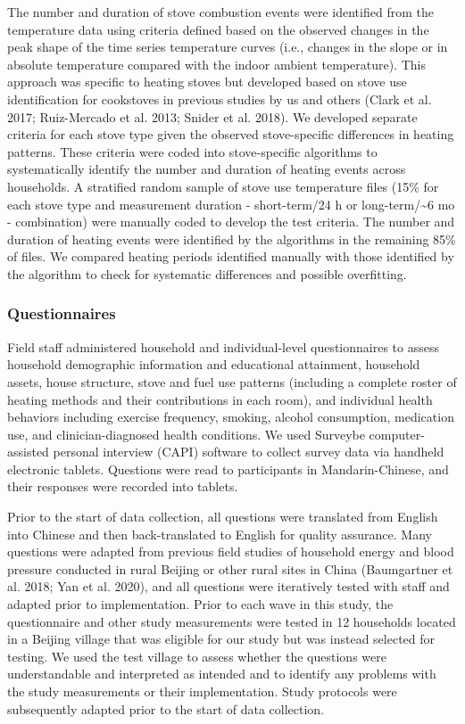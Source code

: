\documentclass[
  letterpaper,
  DIV=11,
  numbers=noendperiod]{scrartcl}
\begin{document}
The number and duration of stove combustion events were identified from
the temperature data using criteria defined based on the observed
changes in the peak shape of the time series temperature curves (i.e.,
changes in the slope or in absolute temperature compared with the indoor
ambient temperature). This approach was specific to heating stoves but
developed based on stove use identification for cookstoves in previous
studies by us and others (Clark et al. 2017; Ruiz-Mercado et al. 2013;
Snider et al. 2018). We developed separate criteria for each stove type
given the observed stove-specific differences in heating patterns. These
criteria were coded into stove-specific algorithms to systematically
identify the number and duration of heating events across households. A
stratified random sample of stove use temperature files (15\% for each
stove type and measurement duration - short-term/24 h or
long-term/\textasciitilde6 mo - combination) were manually coded to
develop the test criteria. The number and duration of heating events
were identified by the algorithms in the remaining 85\% of files. We
compared heating periods identified manually with those identified by
the algorithm to check for systematic differences and possible
overfitting.

\hypertarget{questionnaires}{%
\subsubsection{Questionnaires}\label{questionnaires}}

Field staff administered household and individual-level questionnaires
to assess household demographic information and educational attainment,
household assets, house structure, stove and fuel use patterns
(including a complete roster of heating methods and their contributions
in each room), and individual health behaviors including exercise
frequency, smoking, alcohol consumption, medication use, and
clinician-diagnosed health conditions. We used Surveybe
computer-assisted personal interview (CAPI) software to collect survey
data via handheld electronic tablets. Questions were read to
participants in Mandarin-Chinese, and their responses were recorded into
tablets.

Prior to the start of data collection, all questions were translated
from English into Chinese and then back-translated to English for
quality assurance. Many questions were adapted from previous field
studies of household energy and blood pressure conducted in rural
Beijing or other rural sites in China (Baumgartner et al. 2018; Yan et
al. 2020), and all questions were iteratively tested with staff and
adapted prior to implementation. Prior to each wave in this study, the
questionnaire and other study measurements were tested in 12 households
located in a Beijing village that was eligible for our study but was
instead selected for testing. We used the test village to assess whether
the questions were understandable and interpreted as intended and to
identify any problems with the study measurements or their
implementation. Study protocols were subsequently adapted prior to the
start of data collection.
\end{document}

